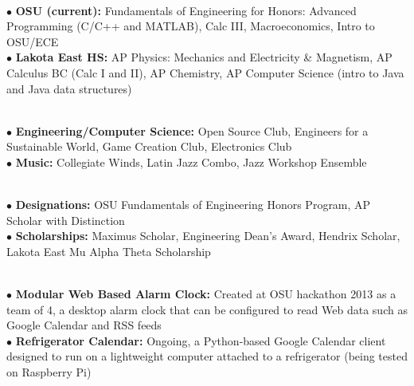 \documentclass[10pt]{article}
\begin{document}
\\
\smallskip
$\bullet$ {\bf OSU (current):} Fundamentals of Engineering for Honors: Advanced Programming (C/C++ and MATLAB), Calc III, Macroeconomics, Intro to OSU/ECE\\
$\bullet$ {\bf Lakota East HS:} AP Physics: Mechanics and Electricity \& Magnetism, AP Calculus BC (Calc I and II), AP Chemistry, AP Computer Science (intro to Java and Java data structures)
\medskip

\\
\smallskip
$\bullet$ {\bf Engineering/Computer Science:} Open Source Club, Engineers for a Sustainable World, Game Creation Club, Electronics Club\\
$\bullet$ {\bf Music:} Collegiate Winds, Latin Jazz Combo, Jazz Workshop Ensemble
\medskip

\\
\smallskip
$\bullet$ {\bf Designations:} OSU Fundamentals of Engineering Honors Program, AP Scholar with Distinction\\
$\bullet$ {\bf Scholarships:} Maximus Scholar, Engineering Dean's Award, Hendrix Scholar, Lakota East Mu Alpha Theta Scholarship
\medskip

\\
\smallskip
$\bullet$ {\bf Modular Web Based Alarm Clock:} Created at OSU hackathon 2013 as a team of 4, a desktop alarm clock that can be configured to read Web data such as Google Calendar and RSS feeds\\
$\bullet$ {\bf Refrigerator Calendar:} Ongoing, a Python-based Google Calendar client designed to run on a lightweight computer attached to a refrigerator (being tested on Raspberry Pi)
\medskip
\end{document}
